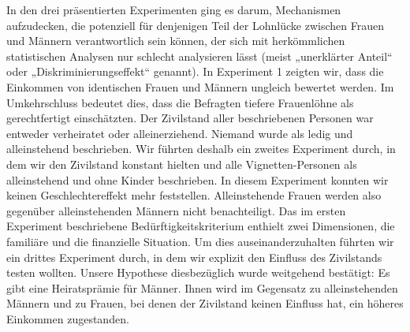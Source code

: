 \documentclass[a4paper,12pt]{article}
\begin{document}
In den drei präsentierten Experimenten ging es darum, Mechanismen aufzudecken, die
potenziell für denjenigen Teil der Lohnlücke zwischen Frauen und Männern
verantwortlich sein können, der sich mit herkömmlichen statistischen Analysen
nur schlecht analysieren lässt (meist „unerklärter Anteil“ oder
„Diskriminierungseffekt“ genannt). In Experiment 1 zeigten wir, dass die
Einkommen von identischen Frauen und Männern ungleich bewertet werden. Im
Umkehrschluss bedeutet dies, dass die Befragten tiefere Frauenlöhne als
gerechtfertigt einschätzten. Der Zivilstand aller beschriebenen Personen war
entweder verheiratet oder alleinerziehend. Niemand wurde als ledig und
alleinstehend beschrieben. Wir führten deshalb ein zweites Experiment durch, in
dem wir den Zivilstand konstant hielten und alle Vignetten-Personen als
alleinstehend und ohne Kinder beschrieben. In diesem Experiment konnten wir
keinen Geschlechtereffekt mehr feststellen. Alleinstehende Frauen werden also
gegenüber alleinstehenden Männern nicht benachteiligt. Das im ersten Experiment
beschriebene Bedürftigkeitskriterium enthielt zwei Dimensionen, die familiäre
und die finanzielle Situation. Um dies auseinanderzuhalten führten wir ein
drittes Experiment durch, in dem wir explizit den Einfluss des Zivilstands
testen wollten. Unsere Hypothese diesbezüglich wurde weitgehend bestätigt: Es
gibt eine Heiratsprämie für Männer. Ihnen wird im Gegensatz zu alleinstehenden
Männern und zu Frauen, bei denen der Zivilstand keinen Einfluss hat, ein
höheres Einkommen zugestanden.
\end{document}
